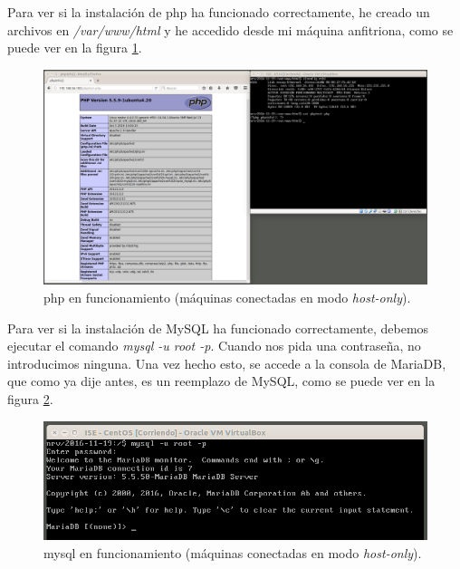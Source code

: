 \documentclass[a4paper,titlepage,12pt]{scrartcl}	%
\numberwithin{figure}{section} %
\numberwithin{table}{section} %
\begin{document}
	Para ver si la instalación de php ha funcionado correctamente, he creado un archivos en \textit{/var/www/html} y he accedido desde mi máquina anfitriona, como se puede ver en la figura \ref{9-php-centos}.
		
	\begin{figure}[H]
		\includegraphics[width=\linewidth]{./Imagenes/9-php-centos.png}
		\vspace{-0.5cm}
		\caption[php en funcionamiento (máquinas conectadas en modo \textit{host-only}).]{php en funcionamiento (máquinas conectadas en modo \textit{host-only}).}
		\label{9-php-centos}
	\end{figure}
	
	Para ver si la instalación de MySQL ha funcionado correctamente, debemos ejecutar el comando \textit{mysql -u root -p}. Cuando nos pida una contraseña, no introducimos ninguna. Una vez hecho esto, se accede a la consola de MariaDB, que como ya dije antes, es un reemplazo de MySQL, como se puede ver en la figura \ref{9-mysql-centos}.
		
	\begin{figure}[H]
		\includegraphics[width=\linewidth]{./Imagenes/9-mysql-centos.png}
		\vspace{-0.5cm}
		\caption[mysql en funcionamiento (máquinas conectadas en modo \textit{host-only}).]{mysql en funcionamiento (máquinas conectadas en modo \textit{host-only}).}
		\label{9-mysql-centos}
	\end{figure}
	
\end{document}
